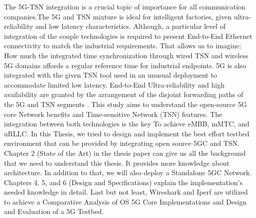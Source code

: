 The 5G-TSN integration is a crucial topic of importance for all communication companies.The 5G and TSN mixture is ideal for intelligent factories, given ultra-reliability and low latency characteristics. Although, a particular level of integration of the couple technologies is required to present End-to-End Ethernet connectivity to match the industrial requirements. That allows us to imagine; How much the integrated time synchronization through wired TSN and wireless 5G domains affords a regular reference time for industrial endpoints. 5G is also integrated with the given TSN tool used in an unusual deployment to accommodate limited low latency. End-to-End Ultra-reliability and high availability are granted by the arrangement of the disjoint forwarding paths of the 5G and TSN segments \cite{Ericsson2019}. This study aims to understand the open-source 5G core Network benefits and Time-sensitive Network (TSN) features. The integration between both technologies is the key To achieve eMBB,  mMTC, and uRLLC. In this Thesis, we tried to design and implement the best effort testbed environment that can be provided by integrating open source 5GC and TSN. Chapter 2 (State of the Art) in the thesis paper can give us all the background that we need to understand this thesis. It provides more knowledge about architecture. In addition to that, we will also deploy a Standalone 5GC Network.
Chapters 4, 5, and 6 (Design and Specifications) explain the implementation's needed knowledge in detail.
Last but not least, Wireshark and Iperf are utilized to achieve a Comparative Analysis of OS 5G Core Implementations and Design and Evaluation of a 5G Testbed.









